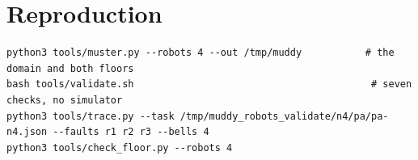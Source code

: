 \documentclass[11pt,a4paper]{article}
\theoremstyle{definition}
\begin{document}
\section*{Reproduction}

\begin{lstlisting}
python3 tools/muster.py --robots 4 --out /tmp/muddy           # the domain and both floors
bash tools/validate.sh                                         # seven checks, no simulator
python3 tools/trace.py --task /tmp/muddy_robots_validate/n4/pa/pa-n4.json --faults r1 r2 r3 --bells 4
python3 tools/check_floor.py --robots 4
\end{lstlisting}
\end{document}
